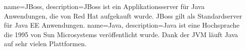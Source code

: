 
\makenoidxglossaries
{}
{
        name=JBoss,
        description={JBoss ist ein Applikationsserver für \Gls{Java} Anwendungen, die von Red Hat aufgekauft wurde.
        JBoss gilt als Standardserver für Java EE Anwendungen\cite{U4ZJDNI2}.}
}
{
        name=Java,
        description={Java ist eine Hochsprache die 1995 von Sun Microsystems veröffentlicht wurde.
Dank der JVM läuft Java auf sehr vielen Plattformen\cite{6H25Z3UI}.}
}
